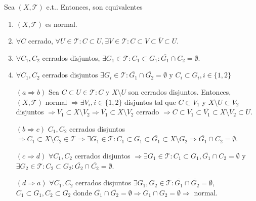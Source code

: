 \begin{prop}
  Sea $( X, \mathcal{T} )$ e.t.. Entonces, son equivalentes
  \begin{enumerate}[label=(\roman*)]
    \item $( X, \mathcal{T} )$ es normal.
    \item $\forall C$ cerrado, $\forall U \in \mathcal{T}: C \subset U, \exists V \in \mathcal{T}: C \subset V \subset \overline{V} \subset U$.
    \item $\forall C_{1}, C_{2}$ cerrados disjuntos, $\exists G_{1} \in \mathcal{T}: C_{1} \subset G_{1}: \overline{G_{1}} \cap C_{2} = \emptyset$.
    \item $\forall C_{1}, C_{2}$ cerrados disjuntos $\exists G_{i} \in \mathcal{T} : \overline{G_{1}} \cap \overline{G_{2}} = \emptyset$ y $C_{i} \subset G_{i}, i \in \{ 1, 2 \}$
  \end{enumerate}
\end{prop}

\begin{dem}
  \begin{enumerate}[label=(\roman*)]
    \item []
    \item [$(a \Rightarrow b)$] Sea $C \subset U \in \mathcal{T}: C$ y $X \setminus U$ son cerrados disjuntos. Entonces, $( X, \mathcal{T} )$ normal $\Rightarrow \exists V_{i}, i \in \{ 1, 2 \}$ disjuntos tal que $C \subset V_{1}$ y $X \setminus U \subset V_{2}$ disjuntos $\Rightarrow V_{1} \subset X \setminus V_{2} \Rightarrow \overline{V_{1}} \subset X \setminus V_{2} $ cerrado $\Rightarrow C \subset V_{1} \subset \overline{V_{1}} \subset X \setminus V_{2} \subset U$.
    \item [$(b \Rightarrow c)$] $C_{1}, C_{2}$ cerrados disjuntos $\Rightarrow C_{1} \subset X \setminus C_{2} \in \mathcal{T} \Rightarrow \exists G_{1} \in \mathcal{T} : C_{1} \subset G_{1} \subset \overline{G_{1}} \subset X \setminus G_{2} \Rightarrow \overline{G_{1}} \cap C_{2} = \emptyset$.
    \item [$(c \Rightarrow d)$] $\forall C_{1}, C_{2}$ cerrados disjuntos $\Rightarrow \exists G_{1} \in \mathcal{T} : C_{1} \subset G_{1}, \overline{G_{1}} \cap C_{2} = \emptyset $ y $ \exists G_{2} \in \mathcal{T} : C_{2} \subset G_{2} : \overline{G_{2}} \cap \overline{C_{2}} = \emptyset$.
    \item [$(d \Rightarrow a)$] $\forall C_{1}, C_{2}$ cerrados disjuntos $\exists G_{1}, G_{2} \in \mathcal{T}: \overline{G_{1}} \cap \overline{G_{2}} = \emptyset$, $C_{1} \subset G_{1}, C_{2} \subset G_{2}$ donde $\overline{G_{1}} \cap \overline{G_{2}} = \emptyset \Rightarrow G_{1} \cap G_{2} = \emptyset \Rightarrow$ normal.
  \end{enumerate}
\end{dem}

